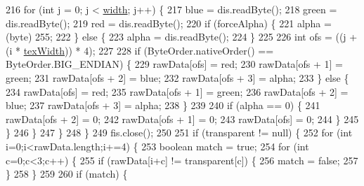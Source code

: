 \begin{DoxyCode}
216                     \textcolor{keywordflow}{for} (\textcolor{keywordtype}{int} j = 0; j < \mbox{\hyperlink{classorg_1_1newdawn_1_1slick_1_1opengl_1_1_t_g_a_image_data_a76539de4fa236043b0f8b31b0ce7c1cf}{width}}; j++) \{
217                         blue = dis.readByte();
218                         green = dis.readByte();
219                         red = dis.readByte();
220                         \textcolor{keywordflow}{if} (forceAlpha) \{
221                             alpha = (byte) 255;
222                         \} \textcolor{keywordflow}{else} \{
223                             alpha = dis.readByte();
224                         \}
225                         
226                         \textcolor{keywordtype}{int} ofs = ((j + (i * \mbox{\hyperlink{classorg_1_1newdawn_1_1slick_1_1opengl_1_1_t_g_a_image_data_a1597fcbecdd0d2875a3950ebe60b2582}{texWidth}})) * 4);
227                         
228                         \textcolor{keywordflow}{if} (ByteOrder.nativeOrder() == ByteOrder.BIG\_ENDIAN) \{
229                             rawData[ofs] = red;
230                             rawData[ofs + 1] = green;
231                             rawData[ofs + 2] = blue;
232                             rawData[ofs + 3] = alpha;
233                         \} \textcolor{keywordflow}{else} \{
234                             rawData[ofs] = red;
235                             rawData[ofs + 1] = green;
236                             rawData[ofs + 2] = blue;
237                             rawData[ofs + 3] = alpha;
238                         \}
239                         
240                         \textcolor{keywordflow}{if} (alpha == 0) \{
241                             rawData[ofs + 2] = 0;
242                             rawData[ofs + 1] = 0;
243                             rawData[ofs] = 0;
244                         \}
245                     \}
246                 \}
247             \}
248         \}
249         fis.close();
250         
251         \textcolor{keywordflow}{if} (transparent != null) \{
252             \textcolor{keywordflow}{for} (\textcolor{keywordtype}{int} i=0;i<rawData.length;i+=4) \{
253                 \textcolor{keywordtype}{boolean} match = \textcolor{keyword}{true};
254                 \textcolor{keywordflow}{for} (\textcolor{keywordtype}{int} c=0;c<3;c++) \{
255                     \textcolor{keywordflow}{if} (rawData[i+c] != transparent[c]) \{
256                         match = \textcolor{keyword}{false};
257                     \}
258                 \}
259       
260                 \textcolor{keywordflow}{if} (match) \{

\end{DoxyCode}
